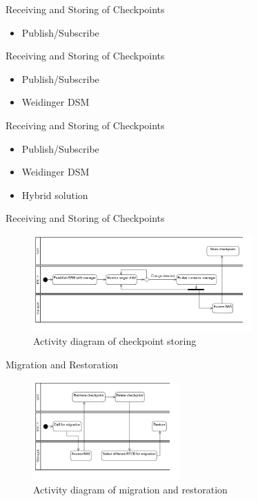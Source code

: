 \documentclass[
  english,            %
  aspectratio=169,    %
]{tumbeamer}
\begin{document}
\begin{frame}{Receiving and Storing of Checkpoints}
\begin{itemize}
    \item Publish/Subscribe
\end{itemize}
\end{frame}

\begin{frame}{Receiving and Storing of Checkpoints}
\begin{itemize}
    \item Publish/Subscribe
    \item Weidinger DSM
\end{itemize}
\end{frame}

\begin{frame}{Receiving and Storing of Checkpoints}
\begin{itemize}
    \item Publish/Subscribe
    \item Weidinger DSM
    \item Hybrid solution
\end{itemize}
\end{frame}

\begin{frame}{Receiving and Storing of Checkpoints}
\begin{figure}
    \centering
    \includegraphics[width=0.75\textwidth]{checkpoint-storing_activity.png}
    \caption{Activity diagram of checkpoint storing}
    \label{fig:storing}
\end{figure}
\end{frame}

\begin{frame}{Migration and Restoration}
\begin{figure}
    \centering
    \includegraphics[width=0.5\textwidth]{migration-restoration_activity.png}
    \caption{Activity diagram of migration and restoration}
    \label{fig:migrating}
\end{figure}
\end{frame}
\end{document}
